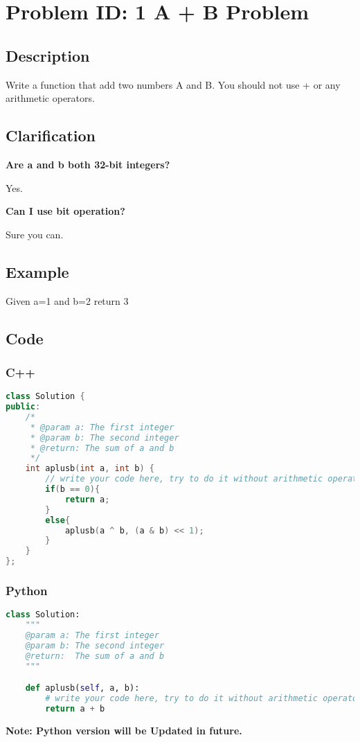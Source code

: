 \section{Problem ID: 1 A + B Problem}
\subsection{Description}
Write a function that add two numbers A and B. You should not use + or any arithmetic operators.

\subsection{Clarification}
\textbf{Are a and b both 32-bit integers?}

Yes.

\textbf{Can I use bit operation?}

Sure you can.

\subsection{Example}
Given a=1 and b=2 return 3

\subsection{Code}
\scriptsize
\subsubsection{C++}
\begin{lstlisting}[language=C++]
class Solution {
public:
    /*
     * @param a: The first integer
     * @param b: The second integer
     * @return: The sum of a and b
     */
    int aplusb(int a, int b) {
        // write your code here, try to do it without arithmetic operators.
        if(b == 0){
            return a;
        }
        else{
            aplusb(a ^ b, (a & b) << 1);
        }
    }
};
\end{lstlisting}

\subsubsection{Python}
\begin{lstlisting}[language=Python]
class Solution:
    """
    @param a: The first integer
    @param b: The second integer
    @return:  The sum of a and b
    """

    def aplusb(self, a, b):
        # write your code here, try to do it without arithmetic operators.
        return a + b
\end{lstlisting}
\normalsize 
\textbf{Note: Python version will be Updated in future.}